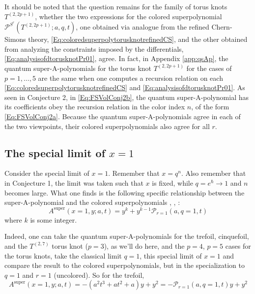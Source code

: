 \documentclass[a4paper,titlepage,twoside]{book}
\begin{document}
It should be noted that the question remains for the family of torus knots $T^{(2,2p+1)}$, whether the two expressions for the colored superpolynomial $\mathcal{P}^{ S^r}{ (T^{(2,2p+1)};a,q,t)}$, one obtained via analogue from the refined Chern-Simons theory, \eqref{Eq:coloredsuperpolytorusknotrefinedCS}, and the other obtained from analyzing the constraints imposed by the differentials, \eqref{Eq:analysisofdtorusknotPr01}, agree.  In fact, in Appendix \ref{app:qsAp}, the quantum super-A-polynomials for the torus knot $T^{(2,2p+1)}$ for the cases of $p=1, \dots , 5$ are the same when one computes a recursion relation on each \eqref{Eq:coloredsuperpolytorusknotrefinedCS} and \eqref{Eq:analysisofdtorusknotPr01}.  As seen in Conjecture 2, in \eqref{Eq:FSVolConj2b}, the quantum super-A-polynomial has its coefficients obey the recursion relation in the color index $n$, of the form \eqref{Eq:FSVolConj2a}.  Because the quantum super-A-polynomials agree in each of the two viewpoints, their colored superpolynomials also agree for all $r$.  

\subsection{The special limit of $x=1$}\label{subsec:x=1}

Consider the special limit of $x=1$.  Remember that $x=q^n$.  Also remember that in Conjecture 1, the limit was taken such that $x$ is fixed, while $q=e^{\hbar}\to 1$ and $n$ becomes large.  What one finds is the following specific relationship between the super-A-polynomial and the colored superpolynomials \cite{bib:FGS2012}, \cite{FujiSulkowski2013}, \cite{FujiGukovStosicSulkowski2013}:
\begin{equation}
A^{\text{super}}{ (x=1, y;a,t) } = y^k + y^{k-1} \mathcal{P}_{r=1}{ (a,q=1,t)}
\end{equation}
where $k$ is some integer. 

Indeed, one can take the quantum super-A-polynomials for the trefoil, cinquefoil, and the $T^{(2,7)}$ torus knot ($p=3$), as we'll do here, and the $p=4$, $p=5$ cases for the torus knots, take the classical limit $q=1$, this special limit of $x=1$ and compare the result to the colored superpolynomials, but in the specialization to $q=1$ and $r=1$ (uncolored).  So for the trefoil,
\begin{equation}
  A^{\text{super}}{ (x=1,y;a,t) } = -{\left(a^{2} t^{3} + a t^{2} + a\right)} y + y^{2} = - \mathcal{P}_{r=1}{ (a,q=1,t) }  y + y^2
\end{equation}
\end{document}
